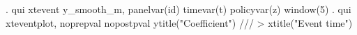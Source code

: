 . qui xtevent y_smooth_m, panelvar(id) timevar(t) policyvar(z) window(5)
{\smallskip}
. qui xteventplot, noprepval nopostpval ytitle("Coefficient") ///
>         xtitle("Event time")
{\smallskip}
